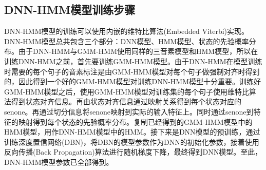\subsection{DNN-HMM模型训练步骤}
DNN-HMM模型的训练可以使用内嵌的维特比算法(Embedded Viterbi)实现。DNN-HMM模型总共包含三个部分：DNN模型、HMM模型、状态的先验概率分布。由于DNN-HMM与GMM-HMM使用同样的三音素模型和HMM模型，所以在训练DNN-HMM之前，首先要训练GMM-HMM模型。由于DNN-HMM在模型训练时需要的每个句子的音素标注是由GMM-HMM模型对每个句子做强制对齐时得到的，因此得到一个好的GMM-HMM模型对训练DNN-HMM模型十分重要。训练好GMM-HMM模型之后，使用GMM-HMM模型对训练集的每个句子使用维特比算法得到状态对齐信息。再由状态对齐信息通过映射关系得到每个状态对应的senone。再通过切分信息将senone映射到实际的输入特征上。同时通过senone到特征的映射得到每个状态的先验概率分布。复制已经得到的GMM-HMM模型中的HMM模型，用作DNN-HMM模型中的HMM。接下来是DNN模型的预训练，通过训练深度置信网络(DBN)，将DBN的模型参数作为DNN的初始化参数，接着使用反向传播(Back Propagation)算法进行随机梯度下降，最终得到DNN模型。至此，DNN-HMM模型参数已全部得到。
